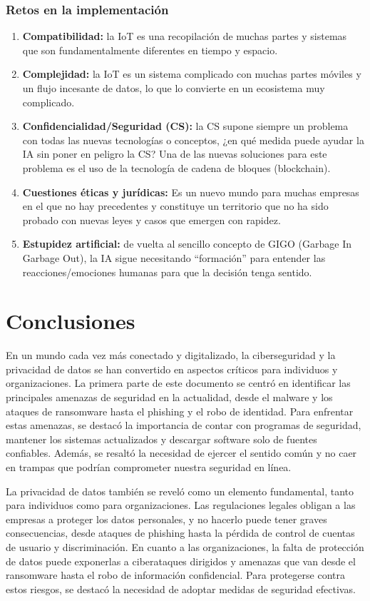\documentclass[12pt]{article}
\begin{document}
  \subsubsection*{Retos en la implementación}
  \begin{enumerate}
    \item \textbf{Compatibilidad:} la IoT es una recopilación de muchas partes y sistemas que son fundamentalmente diferentes en tiempo y espacio.
    \item \textbf{Complejidad:} la IoT es un sistema complicado con muchas partes móviles y un flujo incesante de datos, lo que lo convierte en un ecosistema muy complicado.
    \item \textbf{Confidencialidad/Seguridad (CS):} la CS supone siempre un problema con todas las nuevas tecnologías o conceptos, ¿en qué medida puede ayudar la IA sin poner en peligro la CS? Una de las nuevas soluciones para este problema es el uso de la tecnología de cadena de bloques (blockchain).
    \item \textbf{Cuestiones éticas y jurídicas:} Es un nuevo mundo para muchas empresas en el que no hay precedentes y constituye un territorio que no ha sido probado con nuevas leyes y casos que emergen con rapidez.
    \item \textbf{Estupidez artificial:} de vuelta al sencillo concepto de GIGO (Garbage In Garbage Out), la IA sigue necesitando ``formación'' para entender las reacciones/emociones humanas para que la decisión tenga sentido.
  \end{enumerate}

  \section*{Conclusiones}
  En un mundo cada vez más conectado y digitalizado, la ciberseguridad y la privacidad de datos se han convertido en aspectos críticos para individuos y organizaciones. La primera parte de este documento se centró en identificar las principales amenazas de seguridad en la actualidad, desde el malware y los ataques de ransomware hasta el phishing y el robo de identidad. Para enfrentar estas amenazas, se destacó la importancia de contar con programas de seguridad, mantener los sistemas actualizados y descargar software solo de fuentes confiables. Además, se resaltó la necesidad de ejercer el sentido común y no caer en trampas que podrían comprometer nuestra seguridad en línea.

  La privacidad de datos también se reveló como un elemento fundamental, tanto para individuos como para organizaciones. Las regulaciones legales obligan a las empresas a proteger los datos personales, y no hacerlo puede tener graves consecuencias, desde ataques de phishing hasta la pérdida de control de cuentas de usuario y discriminación. En cuanto a las organizaciones, la falta de protección de datos puede exponerlas a ciberataques dirigidos y amenazas que van desde el ransomware hasta el robo de información confidencial. Para protegerse contra estos riesgos, se destacó la necesidad de adoptar medidas de seguridad efectivas.
\end{document}
